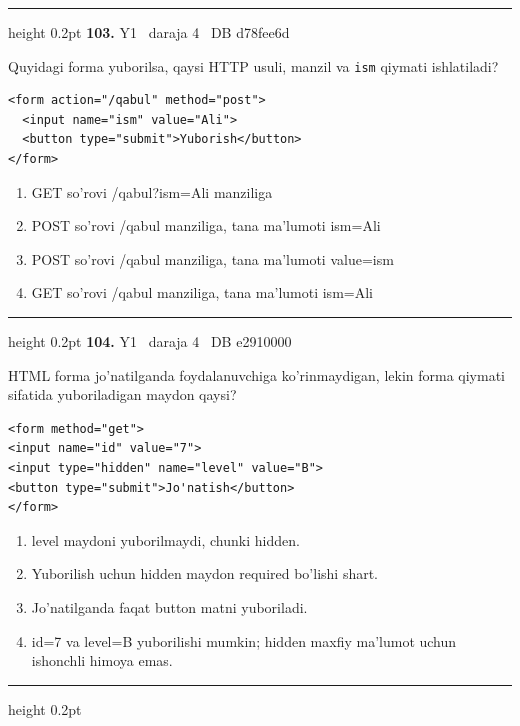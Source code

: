 \documentclass[10pt,a4paper,oneside]{article}
\begin{document}
\vspace{2mm}\hrule height 0.2pt \vspace{4mm}
\hypertarget{q103}{\textbf{\color{ink}103.}}  {\color{muted}\scriptsize Y1 \textbullet\ daraja 4 \textbullet\ DB d78fee6d}
\par
Quyidagi forma yuborilsa, qaysi HTTP usuli, manzil va \texttt{ism} qiymati ishlatiladi?\par
\begin{lstlisting}
<form action="/qabul" method="post">
  <input name="ism" value="Ali">
  <button type="submit">Yuborish</button>
</form>
\end{lstlisting}

\begin{enumerate}[label=\Alph*),leftmargin=9mm]
\item GET so'rovi /qabul?ism=Ali manziliga
\item POST so'rovi /qabul manziliga, tana ma'lumoti ism=Ali
\item POST so'rovi /qabul manziliga, tana ma'lumoti value=ism
\item GET so'rovi /qabul manziliga, tana ma'lumoti ism=Ali
\end{enumerate}
\vspace{2mm}\hrule height 0.2pt \vspace{4mm}
\hypertarget{q104}{\textbf{\color{ink}104.}}  {\color{muted}\scriptsize Y1 \textbullet\ daraja 4 \textbullet\ DB e2910000}
\par
HTML forma jo'natilganda foydalanuvchiga ko'rinmaydigan, lekin forma qiymati sifatida yuboriladigan maydon qaysi?\par
\begin{lstlisting}
<form method="get">
<input name="id" value="7">
<input type="hidden" name="level" value="B">
<button type="submit">Jo'natish</button>
</form>
\end{lstlisting}

\begin{enumerate}[label=\Alph*),leftmargin=9mm]
\item level maydoni yuborilmaydi, chunki hidden.
\item Yuborilish uchun hidden maydon required bo'lishi shart.
\item Jo'natilganda faqat button matni yuboriladi.
\item id=7 va level=B yuborilishi mumkin; hidden maxfiy ma'lumot uchun ishonchli himoya emas.
\end{enumerate}
\vspace{2mm}\hrule height 0.2pt \vspace{4mm}
\end{document}
